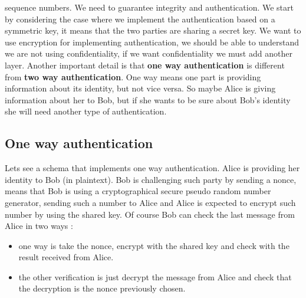 \documentclass[11pt]{article}
\begin{document}
sequence numbers. We need to guarantee integrity and authentication. We start by considering the case where we implement the authentication based on a symmetric key, it means that the two parties are sharing a secret key. We want to use encryption for implementing authentication, we should be able to understand we are not using confidentiality, if we want confidentiality we must add another layer. Another important detail is that \textbf{one way authentication} is different from \textbf{two way authentication}. One way means one part is providing information about its identity, but not vice versa. So maybe Alice is giving information about her to Bob, but if she wants to be sure about Bob's identity she will need another type of authentication.
\subsection{One way authentication}
Lets see a schema that implements one way authentication. Alice is providing her identity to Bob (in plaintext). Bob is challenging such party by sending a nonce, means that Bob is using a cryptographical secure pseudo random number generator, sending such a number to Alice and Alice is expected to encrypt such number by using the shared key. Of course Bob can check the last message from Alice in two ways :
\begin{itemize}
\item one way is take the nonce, encrypt with the shared key and check with the result received from Alice.
\item the other verification is just decrypt the message from Alice and check that the decryption is the nonce previously chosen.
\end{itemize}
\end{document}
